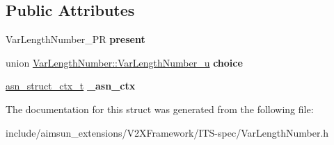 \subsection*{Public Attributes}
\begin{DoxyCompactItemize}
\item 
Var\+Length\+Number\+\_\+\+PR {\bfseries present}\hypertarget{structVarLengthNumber_a804dace25dd70b8bc68214580133f9fc}{}\label{structVarLengthNumber_a804dace25dd70b8bc68214580133f9fc}

\item 
union \hyperlink{unionVarLengthNumber_1_1VarLengthNumber__u}{Var\+Length\+Number\+::\+Var\+Length\+Number\+\_\+u} {\bfseries choice}\hypertarget{structVarLengthNumber_ac920927f311ee3dd95c7fbdd17667a00}{}\label{structVarLengthNumber_ac920927f311ee3dd95c7fbdd17667a00}

\item 
\hyperlink{structasn__struct__ctx__s}{asn\+\_\+struct\+\_\+ctx\+\_\+t} {\bfseries \+\_\+asn\+\_\+ctx}\hypertarget{structVarLengthNumber_a8dc1ef004c3eb3f53b77e5bf62eaea43}{}\label{structVarLengthNumber_a8dc1ef004c3eb3f53b77e5bf62eaea43}

\end{DoxyCompactItemize}


The documentation for this struct was generated from the following file\+:\begin{DoxyCompactItemize}
\item 
include/aimsun\+\_\+extensions/\+V2\+X\+Framework/\+I\+T\+S-\/spec/Var\+Length\+Number.\+h\end{DoxyCompactItemize}
